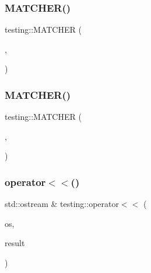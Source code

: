 \mbox{\label{namespacetesting_ab2b645db6909220993662cf43ed0d9e8}} 
\subsubsection{\texorpdfstring{MATCHER()}{MATCHER()}\hspace{0.1cm}{\footnotesize\ttfamily [2/3]}}
{\footnotesize\ttfamily testing\+::\+M\+A\+T\+C\+H\+ER (\begin{DoxyParamCaption}\item[{Is\+True}]{,  }\item[{negation ? \char`\"{}is false\char`\"{} \+:\char`\"{}is true\char`\"{}}]{ }\end{DoxyParamCaption})}

\mbox{\label{namespacetesting_a03fb223cceaefc67991ac36286dcbb34}} 
\subsubsection{\texorpdfstring{MATCHER()}{MATCHER()}\hspace{0.1cm}{\footnotesize\ttfamily [3/3]}}
{\footnotesize\ttfamily testing\+::\+M\+A\+T\+C\+H\+ER (\begin{DoxyParamCaption}\item[{Is\+False}]{,  }\item[{negation ? \char`\"{}is true\char`\"{} \+:\char`\"{}is false\char`\"{}}]{ }\end{DoxyParamCaption})}

\mbox{\label{namespacetesting_a7c88897836b9f492190fb2b9dfa3a327}} 
\subsubsection{\texorpdfstring{operator$<$$<$()}{operator<<()}\hspace{0.1cm}{\footnotesize\ttfamily [1/2]}}
{\footnotesize\ttfamily std\+::ostream \& testing\+::operator$<$$<$ (\begin{DoxyParamCaption}\item[{std\+::ostream \&}]{os,  }\item[{const Test\+Part\+Result \&}]{result }\end{DoxyParamCaption})}


